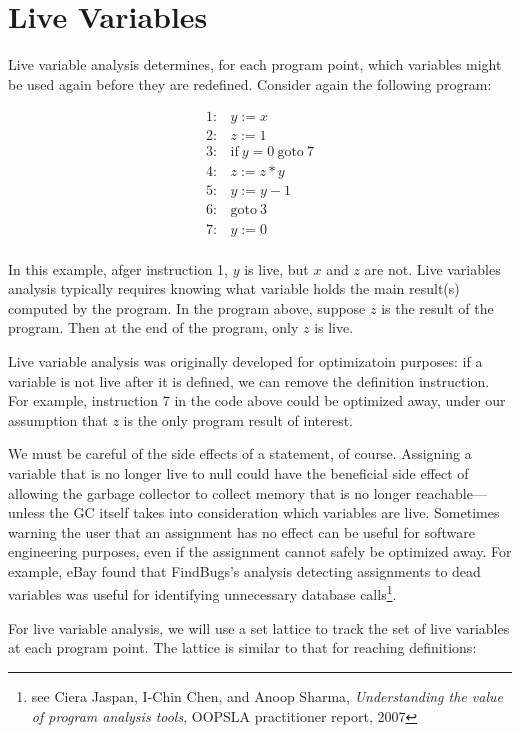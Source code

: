 \documentclass[11pt]{article}
\begin{document}
\section{Live Variables}

Live variable analysis determines, for each program point, which variables might be used again before they are redefined.  Consider again the following program:

\[
\begin{array}{ll}
1: & y := x\\
2: & z := 1\\
3: & \mbox{if}~ y = 0 ~\mbox{goto}~ 7\\
4: & z := z * y\\
5: & y := y - 1\\
6: & \mbox{goto}~ 3\\
7: & y := 0\\
\end{array}
\]

In this example, afger instruction 1, $y$ is live, but $x$ and $z$ are not.  Live variables analysis typically requires knowing what variable holds the main result(s) computed by the program.  In the program above, suppose $z$ is the result of the program.  Then at the end of the program, only $z$ is live.

Live variable analysis was originally developed for optimizatoin purposes: if a variable is not live after it is defined, we can remove the definition instruction.  For example, instruction 7 in the code above could be optimized away, under our assumption that $z$ is the only program result of interest.

We must be careful of the side effects of a statement, of course.  Assigning a variable that is no longer live to null could have the beneficial side effect of allowing the garbage collector to collect memory that is no longer reachable---unless the GC itself takes into consideration which variables are live.  Sometimes warning the user that an assignment has no effect can be useful for software engineering purposes, even if the assignment cannot safely be optimized away.  For example, eBay found that FindBugs's analysis detecting assignments to dead variables was useful for identifying unnecessary database calls\footnote{see Ciera Jaspan, I-Chin Chen, and Anoop Sharma, \textit{Understanding the value of program analysis tools}, OOPSLA practitioner report, 2007}.

For live variable analysis, we will use a set lattice to track the set of live variables at each program point.  The lattice is similar to that for reaching definitions:
\end{document}
